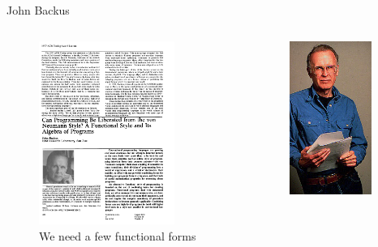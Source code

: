 \documentclass[10pt]{beamer}
\begin{document}
\begin{frame}{John Backus}
    \begin{columns}
        \begin{column}{0.6\textwidth}
            \begin{figure}
    	        \includegraphics[height=6cm]{images/functional.png}
	    	    \caption{We need a few functional forms}
            \end{figure}
        \end{column}
        \begin{column}{0.4\textwidth}  %
                \begin{center}
					\includegraphics[height=5cm]{images/backus.jpg}
                \end{center}
        \end{column}
    \end{columns}
\end{frame}
\end{document}
